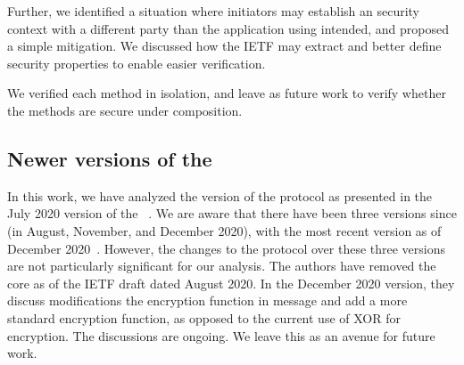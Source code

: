 \documentclass[runningheads, envcountsame, hidelinks, a4paper, draft, x11names]{llncs}
\begin{document}
Further, we identified a situation where initiators may establish an \mOscore{}
security context with a different party than the application using \mEdhoc{}
intended, and proposed a simple mitigation.
%
We discussed how the IETF may extract and better define security properties to
enable easier verification.

We verified each method in isolation, and leave as future work to verify whether
the methods are secure under composition.

\subsection{Newer versions of the \mSpec} \label{sec:newdrafts}
In this work, we have analyzed the version of the \mEdhoc{} protocol as
presented in the July 2020 version of the
\mSpec{}~\cite{our-analysis-selander-lake-edhoc-00}.
%
We are aware that there have been three versions since
(in August, November, and December 2020), with the most recent version as
of December 2020~\cite{latest-ietf-lake-edhoc-03}.
%
However, the changes to the protocol over these three versions are not
particularly significant for our analysis.
%
The authors have removed the \mPskPsk{} core as of the IETF draft dated August
2020.
%
In the December 2020 version, they discuss modifications the encryption
function in message \mMsgtwo{} and add a more standard encryption function,
as opposed to the current use of XOR for encryption.
%
The discussions are ongoing.
%
We leave this as an avenue for future work.\\

%
%






\appendix

\section{\mPsk}
\label{sec:appendixPsk}
\end{document}
